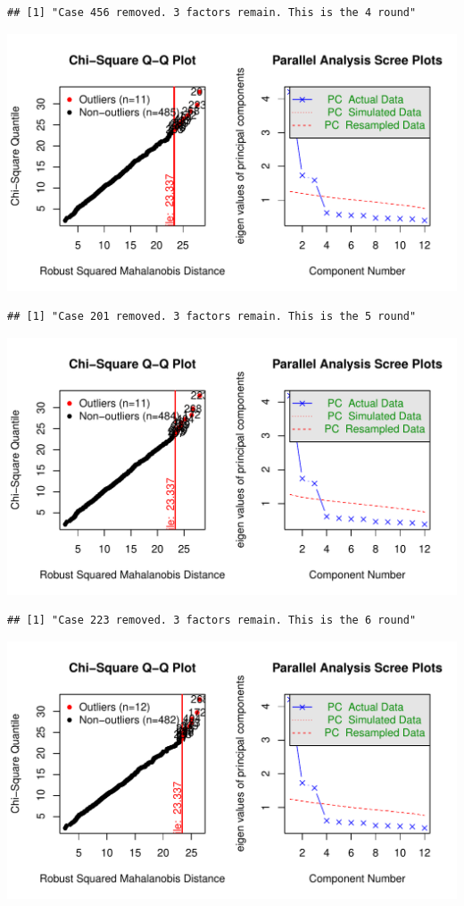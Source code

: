 \documentclass{article}\usepackage[]{graphicx}\usepackage[]{color}
\makeatletter
\def\maxwidth{ %
  \ifdim\Gin@nat@width>\linewidth
    \linewidth
  \else
    \Gin@nat@width
  \fi
}
\newenvironment{kframe}{%
 \def\at@end@of@kframe{}%
 \ifinner\ifhmode%
  \def\at@end@of@kframe{\end{minipage}}%
  \begin{minipage}{\columnwidth}%
 \fi\fi%
 \def\FrameCommand##1{\hskip\@totalleftmargin \hskip-\fboxsep
 \colorbox{shadecolor}{##1}\hskip-\fboxsep
     \hskip-\linewidth \hskip-\@totalleftmargin \hskip\columnwidth}%
 \MakeFramed {\advance\hsize-\width
   \@totalleftmargin\z@ \linewidth\hsize
   \@setminipage}}%
 {\par\unskip\endMakeFramed%
 \at@end@of@kframe}
\newenvironment{knitrout}{}{} %
\makeatother
\begin{document}
\begin{knitrout}
\begin{kframe}\begin{verbatim}
## [1] "Case 456 removed. 3 factors remain. This is the 4 round"
\end{verbatim}
\end{kframe}
\includegraphics[width=\maxwidth]{figure/unnamed-chunk-10-5} 
\begin{kframe}\begin{verbatim}
## [1] "Case 201 removed. 3 factors remain. This is the 5 round"
\end{verbatim}
\end{kframe}
\includegraphics[width=\maxwidth]{figure/unnamed-chunk-10-6} 
\begin{kframe}\begin{verbatim}
## [1] "Case 223 removed. 3 factors remain. This is the 6 round"
\end{verbatim}
\end{kframe}
\includegraphics[width=\maxwidth]{figure/unnamed-chunk-10-7} 

\end{knitrout}
\end{document}

